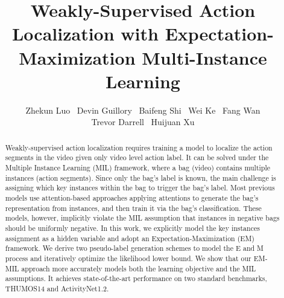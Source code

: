\documentclass[runningheads]{llncs}
\begin{document}
\pagestyle{headings}
\mainmatter
\def\ECCVSubNumber{6965}  

\title{Weakly-Supervised Action Localization with Expectation-Maximization Multi-Instance Learning}




\author{Zhekun Luo~
Devin Guillory~  
Baifeng Shi~  
Wei Ke~ 
Fang Wan \\
Trevor Darrell~ 
Huijuan Xu 
}


\maketitle
\begin{abstract}
Weakly-supervised action localization  requires training a model to localize the action segments in the video given only video level action label. It can be solved under the Multiple Instance Learning (MIL) framework, where a bag (video) contains multiple instances (action segments). Since only the bag's label is known, the main challenge is assigning which key instances within the bag to trigger the bag's label. Most previous models use attention-based approaches applying attentions to generate the bag's representation from instances, and then train it via the bag's classification. These models, however, implicitly violate the MIL assumption that instances in negative bags should be uniformly negative. In this work, we explicitly model the key instances assignment as a hidden variable and adopt an Expectation-Maximization (EM) framework. We derive two pseudo-label generation schemes to model the E and M process and iteratively optimize the likelihood lower bound. We show that our EM-MIL approach more accurately models both the learning objective and the MIL assumptions. It achieves state-of-the-art performance on two standard benchmarks, THUMOS14 and ActivityNet1.2.





\end{abstract}
\end{document}
